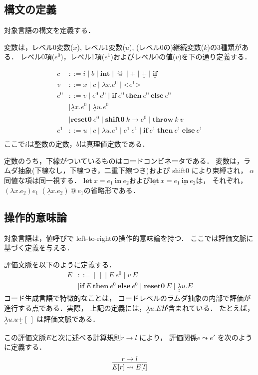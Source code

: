 \documentclass[T]{compsoft}
\makeatletter
\newcommand\fun[2]{\lambda{#1}.{#2}}
\newcommand\Resetz{\textbf{reset0}}
\newcommand\Shiftz{\textbf{shift0}}
\newcommand\Throw{\textbf{throw}}
\newcommand\resetz[1]{\Resetz~{#1}}
\newcommand\shiftz[2]{\Shiftz~{#1}\to{#2}}
\newcommand\throw[2]{\Throw~{#1}~{#2}}
\newcommand\cfun[2]{\underline{\lambda}{#1}.{#2}}
\newcommand\ccfun[2]{\underline{\underline{\lambda}}{#1}.{#2}}
\newcommand\cPlus{\underline{\textbf{+}}}
\newcommand\cLet{\underline{\textbf{let}}}
\newcommand\cIn{\underline{\textbf{in}}}
\newcommand\clet[3]{\cLet~{#1}={#2}~\cIn~{#3}}
\newcommand\cint{\underline{\textbf{int}}}
\newcommand\code[1]{\texttt{<}{#1}\texttt{>}}
\newcommand\Let{\textbf{let}}
\newcommand\In{\textbf{in}}
\newcommand\letin[3]{\Let~{#1}={#2}~\In~{#3}}
\newcommand\ift[3]{\textbf{if}~{#1}~\textbf{then}~{#2}~\textbf{else}~{#3}}
\newcommand\cIf{\underline{\textbf{if}}}
\newcommand\lto{\leadsto}
\newcommand\cat{~\underline{@}~}
\theoremstyle{break}
\makeatother
\begin{document}
\subsection{構文の定義}

対象言語の構文を定義する．

変数は，レベル0変数($x$), レベル1変数($u$),
(レベル0の)継続変数($k$)の3種類がある．
レベル0項($e^0$)，レベル1項($e^1$)およびレベル0の値($v$)を下の通り定義する．

\begin{align*}
  c & ::= i \mid b \mid \cint
      \mid \cat \mid + \mid \cPlus \mid \cIf \\
  v & ::= x \mid c \mid \fun{x}{e^0} \mid \code{e^1} \\
  e^0 & ::=  v  \mid e^0~ e^0 \mid \ift{e^0}{e^0}{e^0} \\
    & \mid \cfun{x}{e^0}
      \mid \ccfun{u}{e^0} \\
    & \mid \resetz{e^0}
      \mid \shiftz{k}{e^0}
      \mid \throw{k}{v} \\
  e^1 & ::=  u \mid c \mid \fun{u}{e^1} \mid e^1~ e^1
        \mid \ift{e^1}{e^1}{e^1} \\
\end{align*}
ここで$i$は整数の定数，$b$は真理値定数である．

定数のうち，下線がついているものはコードコンビネータである．
変数は，ラムダ抽象(下線なし，下線つき，二重下線つき)および shift0 により束縛され，
$\alpha$同値な項は同一視する．
$\letin{x}{e_1}{e_2}$および$\clet{x}{e_1}{e_2}$は，
それぞれ，$(\fun{x}{e_2})e_1$
$(\cfun{x}{e_2})\cat e_1$の省略形である．

\subsection{操作的意味論}

対象言語は，値呼びで left-to-rightの操作的意味論を持つ．
ここでは評価文脈に基づく定義を与える．

評価文脈を以下のように定義する．
\begin{align*}
  E & ::= [~] \mid E~ e^0 \mid v~ E \\
    & \mid \ift{E}{e^0}{e^0} \mid \Resetz~ E \mid \ccfun{u}{E}
\end{align*}
コード生成言語で特徴的なことは，
コードレベルのラムダ抽象の内部で評価が進行する点である．実際，
上記の定義には，$\ccfun{u}{E}$が含まれている．
たとえば，$\ccfun{u}{u \cPlus [~]}$ は評価文脈である．

この評価文脈$E$と次に述べる計算規則$r \to l$ により，
評価関係$e \lto e'$ を次のように定義する．
\[
  \infer{E[r] \lto E[l]}{r \to l}
\]
\end{document}
